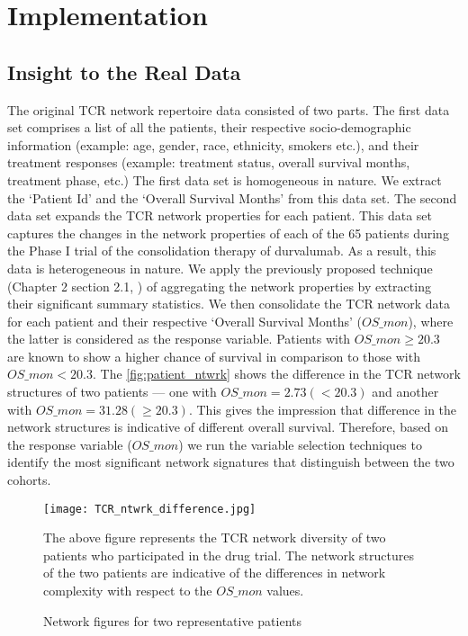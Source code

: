 \chapter{Implementation}
\section{Insight to the Real Data}
The original TCR network repertoire data consisted of two parts. The first data set comprises a list of all the patients, their respective socio-demographic information (example: age, gender, race, ethnicity, smokers etc.), and their treatment responses (example: treatment status, overall survival months, treatment phase, etc.) The first data set is homogeneous in nature. We extract the \lq Patient Id' and the \lq Overall Survival Months' from this data set. The second data set expands the TCR network properties for each patient. This data set captures the changes in the network properties of each of the 65 patients during the Phase I trial of the consolidation therapy of durvalumab. As a result, this data is heterogeneous in nature. We apply the previously proposed technique (Chapter 2 section 2.1, ) of aggregating the network properties by extracting their significant summary statistics. We then consolidate the TCR network data for each patient and their respective \lq Overall Survival Months' ($OS\_mon$), where the latter is considered as the response variable. Patients with $OS\_mon\ge20.3$ are known to show a higher chance of survival in comparison to those with $OS\_mon< 20.3$. The \autoref{fig:patient_ntwrk} shows the difference in the TCR network structures of two patients --- one with $OS\_mon=2.73(<20.3)$ and another with $OS\_mon=31.28(\ge20.3)$. This gives the impression that difference in the network structures is indicative of different overall survival. Therefore, based on the response variable ($OS\_mon$) we run the variable selection techniques to identify the most significant network signatures that distinguish between the two cohorts.\par
\begin{figure}[H]
\centering
\texttt{[image: TCR\_ntwrk\_difference.jpg]}
\caption{ Network figures for two representative patients}%
{The above figure represents the TCR network diversity of two patients who participated in the drug trial. The network structures of the two patients are indicative of the differences in network complexity with respect to the $OS\_mon$ values.}
\label{fig:patient_ntwrk}
\end{figure}

